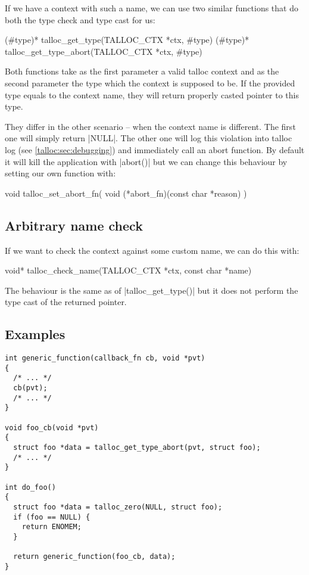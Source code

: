 If we have a context with such a name, we can use two similar functions that do
both the type check and type cast for us:

\begin{funcproto}
(#type)* talloc_get_type(TALLOC_CTX *ctx, #type)
(#type)* talloc_get_type_abort(TALLOC_CTX *ctx, #type)
\end{funcproto}
\funclistend
Both functions take as the first parameter a valid talloc context and as the
second parameter the type which the context is supposed to be. If the provided
type equals to the context name, they will return properly casted pointer to
this type.

They differ in the other scenario -- when the context name is different. The
first one will simply return |NULL|. The other one will log this violation into
talloc log (see \ref{talloc:sec:debugging}) and immediately call an abort
function. By default it will kill the application with |abort()| but we can
change this behaviour by setting our own function with:

\begin{funcproto}
void talloc_set_abort_fn(
  void (*abort_fn)(const char *reason)
)
\end{funcproto}

\subsection{Arbitrary name check}

If we want to check the context against some custom name, we can do this with:

\begin{funcproto}
void* talloc_check_name(TALLOC_CTX *ctx, const char *name)
\end{funcproto}
\funclistend
The behaviour is the same as of |talloc_get_type()| but it does not perform the
type cast of the returned pointer.

\subsection{Examples}

\begin{lstlisting}[caption={Dynamic type system \#1}]
int generic_function(callback_fn cb, void *pvt)
{
  /* ... */
  cb(pvt);
  /* ... */
}

void foo_cb(void *pvt)
{
  struct foo *data = talloc_get_type_abort(pvt, struct foo);
  /* ... */
}

int do_foo()
{
  struct foo *data = talloc_zero(NULL, struct foo);
  if (foo == NULL) {
    return ENOMEM;
  }

  return generic_function(foo_cb, data);
}
\end{lstlisting}

